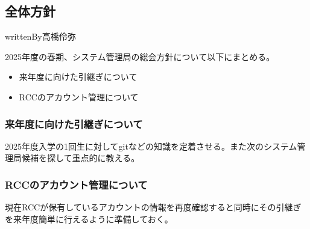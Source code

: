 \subsection*{全体方針}

writtenBy{\systemStaff}{高橋}{伶弥}

2025年度の春期、システム管理局の総会方針について以下にまとめる。
\begin{itemize}
    \item 来年度に向けた引継ぎについて
    \item RCCのアカウント管理について
\end{itemize}

\subsubsection*{来年度に向けた引継ぎについて}
2025年度入学の1回生に対してgitなどの知識を定着させる。また次のシステム管理局候補を探して重点的に教える。

\subsubsection*{RCCのアカウント管理について}
現在RCCが保有しているアカウントの情報を再度確認すると同時にその引継ぎを来年度簡単に行えるように準備しておく。